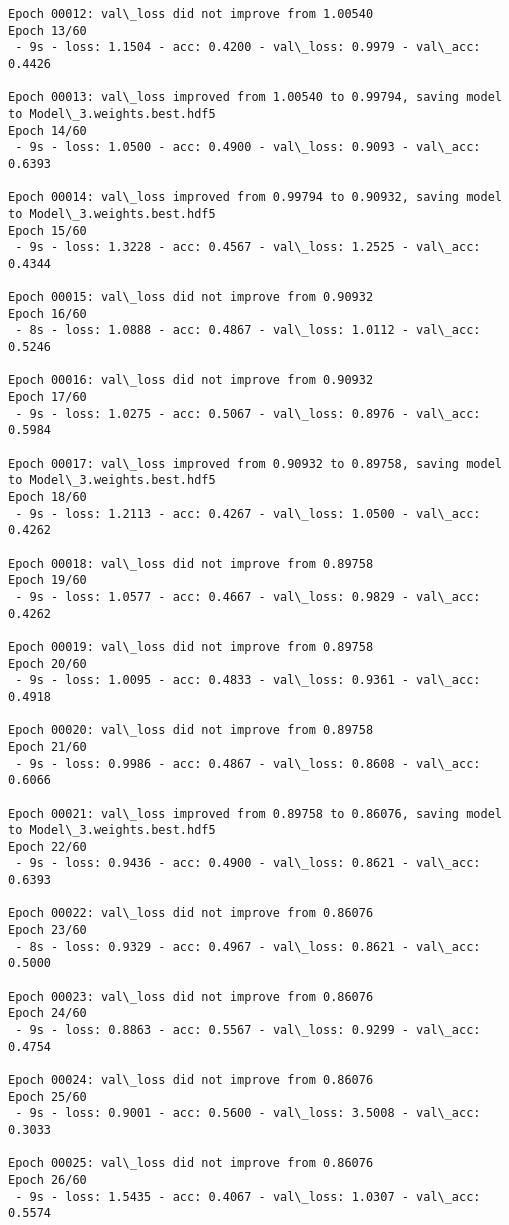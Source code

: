 \documentclass[11pt]{article}
\begin{document}
\begin{Verbatim}[commandchars=\\\{\}]
Epoch 00012: val\_loss did not improve from 1.00540
Epoch 13/60
 - 9s - loss: 1.1504 - acc: 0.4200 - val\_loss: 0.9979 - val\_acc: 0.4426

Epoch 00013: val\_loss improved from 1.00540 to 0.99794, saving model to Model\_3.weights.best.hdf5
Epoch 14/60
 - 9s - loss: 1.0500 - acc: 0.4900 - val\_loss: 0.9093 - val\_acc: 0.6393

Epoch 00014: val\_loss improved from 0.99794 to 0.90932, saving model to Model\_3.weights.best.hdf5
Epoch 15/60
 - 9s - loss: 1.3228 - acc: 0.4567 - val\_loss: 1.2525 - val\_acc: 0.4344

Epoch 00015: val\_loss did not improve from 0.90932
Epoch 16/60
 - 8s - loss: 1.0888 - acc: 0.4867 - val\_loss: 1.0112 - val\_acc: 0.5246

Epoch 00016: val\_loss did not improve from 0.90932
Epoch 17/60
 - 9s - loss: 1.0275 - acc: 0.5067 - val\_loss: 0.8976 - val\_acc: 0.5984

Epoch 00017: val\_loss improved from 0.90932 to 0.89758, saving model to Model\_3.weights.best.hdf5
Epoch 18/60
 - 9s - loss: 1.2113 - acc: 0.4267 - val\_loss: 1.0500 - val\_acc: 0.4262

Epoch 00018: val\_loss did not improve from 0.89758
Epoch 19/60
 - 9s - loss: 1.0577 - acc: 0.4667 - val\_loss: 0.9829 - val\_acc: 0.4262

Epoch 00019: val\_loss did not improve from 0.89758
Epoch 20/60
 - 9s - loss: 1.0095 - acc: 0.4833 - val\_loss: 0.9361 - val\_acc: 0.4918

Epoch 00020: val\_loss did not improve from 0.89758
Epoch 21/60
 - 9s - loss: 0.9986 - acc: 0.4867 - val\_loss: 0.8608 - val\_acc: 0.6066

Epoch 00021: val\_loss improved from 0.89758 to 0.86076, saving model to Model\_3.weights.best.hdf5
Epoch 22/60
 - 9s - loss: 0.9436 - acc: 0.4900 - val\_loss: 0.8621 - val\_acc: 0.6393

Epoch 00022: val\_loss did not improve from 0.86076
Epoch 23/60
 - 8s - loss: 0.9329 - acc: 0.4967 - val\_loss: 0.8621 - val\_acc: 0.5000

Epoch 00023: val\_loss did not improve from 0.86076
Epoch 24/60
 - 9s - loss: 0.8863 - acc: 0.5567 - val\_loss: 0.9299 - val\_acc: 0.4754

Epoch 00024: val\_loss did not improve from 0.86076
Epoch 25/60
 - 9s - loss: 0.9001 - acc: 0.5600 - val\_loss: 3.5008 - val\_acc: 0.3033

Epoch 00025: val\_loss did not improve from 0.86076
Epoch 26/60
 - 9s - loss: 1.5435 - acc: 0.4067 - val\_loss: 1.0307 - val\_acc: 0.5574


\end{Verbatim}
\end{document}
